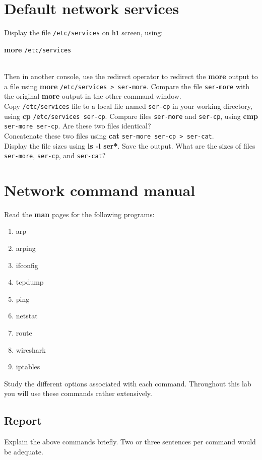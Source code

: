 \documentclass[10pt,a4paper]{article}
\numberwithin{equation}{section}
\numberwithin{figure}{section}
\numberwithin{table}{section}
\begin{document}
    \section{Default network services}
    Display the file \texttt{/etc/services} on \texttt{h1} screen, using: \\
    \centerline{\textbf{more} \texttt{/etc/services}} \\
    Then in another console, use the redirect operator to redirect the \textbf{more} output to
    a file using \textbf{more} \texttt{/etc/services > ser-more}. Compare the file \texttt{ser-more} with the original \textbf{more} output in the other command window. \\
    Copy \texttt{/etc/services} file to a local file named \texttt{ser-cp} in your working directory,
    using \textbf{cp} \texttt{/etc/services ser-cp}. Compare files \texttt{ser-more} and \texttt{ser-cp}, using \textbf{cmp} \texttt{ser-more ser-cp}. Are these two files identical?\\
    Concatenate these two files using \textbf{cat} \texttt{ser-more ser-cp > ser-cat}. \\
    Display the file sizes using \textbf{ls -l ser*}. Save the output. What are the sizes of files \texttt{ser-more}, \texttt{ser-cp}, and \texttt{ser-cat}?

    \section{Network command manual}
    Read the \textbf{man} pages for the following programs:
\begin{multicols}{3}
    \begin{enumerate}
        \item arp
        \item arping
        \item ifconfig
        \item tcpdump
        \item ping
        \item netstat
        \item route
        \item wireshark
        \item iptables
    \end{enumerate}
\end{multicols}
    Study the different options associated with each command.
    Throughout this lab you will use these commands rather extensively.
    \subsection*{Report}
    Explain the above commands briefly.
    Two or three sentences per command would be adequate.
\end{document}
